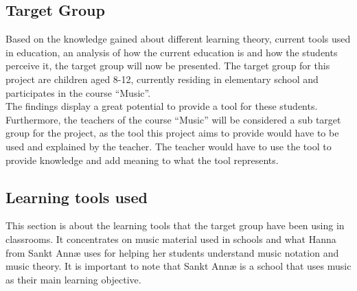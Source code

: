 \subsection{Target Group} 
Based on the knowledge gained about different learning theory, current tools used in education, an analysis of how the current education is and how the students perceive it, the target group will now be presented.
The target group for this project are children aged 8-12, currently residing in elementary school and participates in the course “Music”.\\

The findings display a great potential to provide a tool for these students.
Furthermore, the teachers of the course “Music” will be considered a sub target group for the project, as the tool this project aims to provide would have to be used and explained by the teacher. The teacher would have to use the tool to provide knowledge and add meaning to what the tool represents.
 
 
\subsection{Learning tools used}%
This section is about the learning tools that the target group have been using in classrooms. It concentrates on music material used in schools and what Hanna from Sankt Annæ uses for helping her students understand music notation and music theory. It is important to note that Sankt Annæ is a school that uses music as their main learning objective.  

